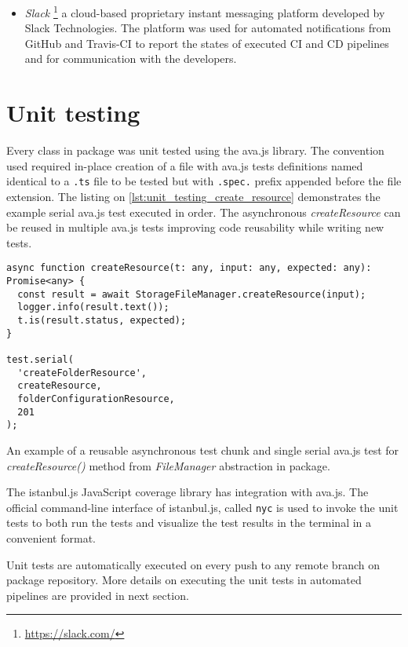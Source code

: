 \begin{itemize}
    \item \textit{Slack} \footnote{\url{https://slack.com/}} a cloud-based proprietary instant messaging platform developed by Slack Technologies. The platform was used for automated notifications from GitHub and Travis-CI to report the states of executed CI and CD pipelines and for communication with the \lpa{} developers.
\end{itemize} 

\section{Unit testing}

Every class in \lpas{} package was unit tested using the ava.js library. The convention used required in-place creation of a file with ava.js tests definitions named identical to a \texttt{.ts} file to be tested but with \texttt{.spec.} prefix appended before the file extension. The listing on \autoref{lst:unit_testing_create_resource} demonstrates the example serial ava.js test executed in order. The asynchronous \textit{createResource} can be reused in multiple ava.js tests improving code reusability while writing new tests.

\begin{listing}[H]    
\begin{verbatim}
async function createResource(t: any, input: any, expected: any): Promise<any> {
  const result = await StorageFileManager.createResource(input);
  logger.info(result.text());
  t.is(result.status, expected);
}

test.serial(
  'createFolderResource',
  createResource,
  folderConfigurationResource,
  201
);
\end{verbatim}
\caption{An example of a reusable asynchronous test chunk and single serial ava.js test for \textit{createResource()} method from \textit{FileManager} abstraction in \lpas{} package.} 
\label{lst:unit_testing_create_resource}
\end{listing}

The istanbul.js JavaScript coverage library has integration with ava.js. The official command-line interface of istanbul.js, called \texttt{nyc} is used to invoke the unit tests to both run the tests and visualize the test results in the terminal in a convenient format.

Unit tests are automatically executed on every push to any remote branch on \lpas{} package repository. More details on executing the unit tests in automated pipelines are provided in next section.

